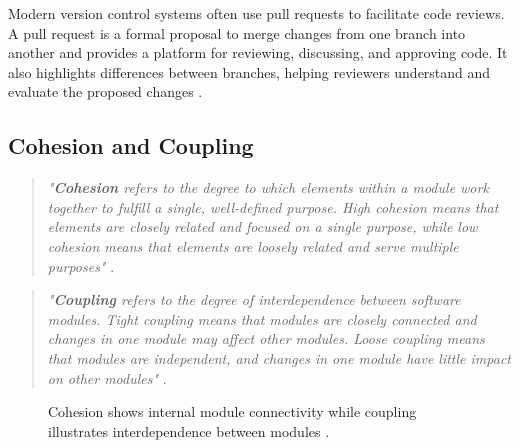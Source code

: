 Modern version control systems often use pull requests to facilitate code reviews. A pull request is a formal proposal to merge changes from one branch into another and provides a platform for reviewing, discussing, and approving code. It also highlights differences between branches, helping reviewers understand and evaluate the proposed changes \cite{github:pr}.

\subsection{Cohesion and Coupling}
\label{subsec:cohesion-and-coupling}

\begin{quote}
\textit{"\textbf{Cohesion} refers to the degree to which elements within a module work together to fulfill a single, well-defined purpose. High cohesion means that elements are closely related and focused on a single purpose, while low cohesion means that elements are loosely related and serve multiple purposes"} \cite{geeksforgeeks:c&c}. \\
\end{quote}

\begin{quote}
\textit{"\textbf{Coupling} refers to the degree of interdependence between software modules. Tight coupling means that modules are closely connected and changes in one module may affect other modules. Loose coupling means that modules are independent, and changes in one module have little impact on other modules"} \cite{geeksforgeeks:c&c}. \\
\end{quote}

\begin{figure}[h!]
    \centering

    \caption[Cohesion and coupling]{Cohesion shows internal module connectivity while coupling illustrates interdependence between modules \cite{geeksforgeeks:c&c}.}
    \label{fig:cohesion-coupling}
\end{figure}

